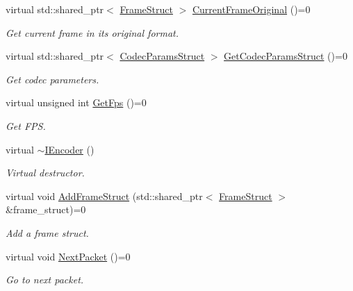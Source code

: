 \begin{DoxyCompactItemize}
virtual std\+::shared\+\_\+ptr$<$ \hyperlink{structmoetsi_1_1ssp_1_1FrameStruct}{Frame\+Struct} $>$ \hyperlink{classmoetsi_1_1ssp_1_1IEncoder_ab60bdaae0a85289dfa31a12bab533dc0}{Current\+Frame\+Original} ()=0
\begin{DoxyCompactList}\small\item\em Get current frame in its original format. \end{DoxyCompactList}\item 
virtual std\+::shared\+\_\+ptr$<$ \hyperlink{structmoetsi_1_1ssp_1_1CodecParamsStruct}{Codec\+Params\+Struct} $>$ \hyperlink{classmoetsi_1_1ssp_1_1IEncoder_ad5179efaa4c74207766dd64f46f4059a}{Get\+Codec\+Params\+Struct} ()=0
\begin{DoxyCompactList}\small\item\em Get codec parameters. \end{DoxyCompactList}\item 
virtual unsigned int \hyperlink{classmoetsi_1_1ssp_1_1IEncoder_ae6a865aa52230d81aed1cb5232402f6c}{Get\+Fps} ()=0
\begin{DoxyCompactList}\small\item\em Get F\+PS. \end{DoxyCompactList}\item 
\mbox{\label{classmoetsi_1_1ssp_1_1IEncoder_a6c19808ebe6a05dbce630c45188b9346}} 
virtual \hyperlink{classmoetsi_1_1ssp_1_1IEncoder_a6c19808ebe6a05dbce630c45188b9346}{$\sim$\+I\+Encoder} ()
\begin{DoxyCompactList}\small\item\em Virtual destructor. \end{DoxyCompactList}\item 
virtual void \hyperlink{classmoetsi_1_1ssp_1_1IEncoder_a8c223ec82fdd30ee8ee75157306054ec}{Add\+Frame\+Struct} (std\+::shared\+\_\+ptr$<$ \hyperlink{structmoetsi_1_1ssp_1_1FrameStruct}{Frame\+Struct} $>$ \&frame\+\_\+struct)=0
\begin{DoxyCompactList}\small\item\em Add a frame struct. \end{DoxyCompactList}\item 
\mbox{\label{classmoetsi_1_1ssp_1_1IEncoder_afac3ddcf2f49be16020c83cb9e0fb274}} 
virtual void \hyperlink{classmoetsi_1_1ssp_1_1IEncoder_afac3ddcf2f49be16020c83cb9e0fb274}{Next\+Packet} ()=0
\begin{DoxyCompactList}\small\item\em Go to next packet. \end{DoxyCompactList}\item 

\end{DoxyCompactItemize}
